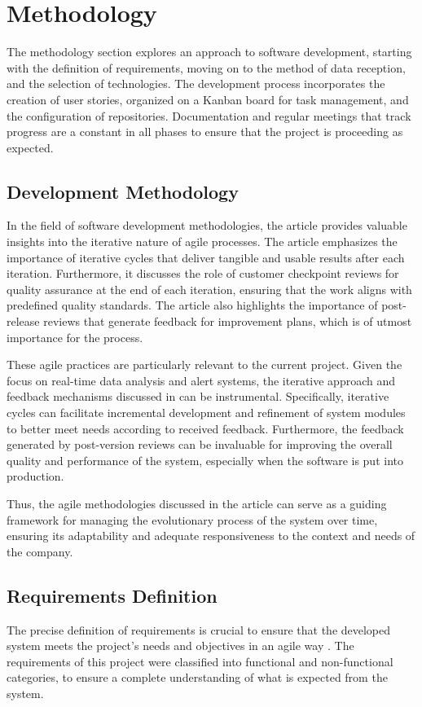 \chapter{Methodology}\label{cap:metodology}
The methodology section explores an approach to software development, starting with the definition of requirements, moving on to the method of data reception, and the selection of technologies. The development process incorporates the creation of user stories, organized on a Kanban board for task management, and the configuration of repositories. Documentation and regular meetings that track progress are a constant in all phases to ensure that the project is proceeding as expected.

\section{Development Methodology}
In the field of software development methodologies, the article \cite{shankarmani2012agile} provides valuable insights into the iterative nature of agile processes. The article emphasizes the importance of iterative cycles that deliver tangible and usable results after each iteration. Furthermore, it discusses the role of customer checkpoint reviews for quality assurance at the end of each iteration, ensuring that the work aligns with predefined quality standards. The article also highlights the importance of post-release reviews that generate feedback for improvement plans, which is of utmost importance for the process.

These agile practices are particularly relevant to the current project. Given the focus on real-time data analysis and alert systems, the iterative approach and feedback mechanisms discussed in \cite{shankarmani2012agile} can be instrumental. Specifically, iterative cycles can facilitate incremental development and refinement of system modules to better meet needs according to received feedback. Furthermore, the feedback generated by post-version reviews can be invaluable for improving the overall quality and performance of the system, especially when the software is put into production.

Thus, the agile methodologies discussed in the article can serve as a guiding framework for managing the evolutionary process of the system over time, ensuring its adaptability and adequate responsiveness to the context and needs of the company.

\section[Requirements Definition]{Requirements Definition}\label{sec:req}The precise definition of requirements is crucial to ensure that the developed system meets the project's needs and objectives in an agile way \cite{asghar2016role}. The requirements of this project were classified into functional and non-functional categories, to ensure a complete understanding of what is expected from the system.

